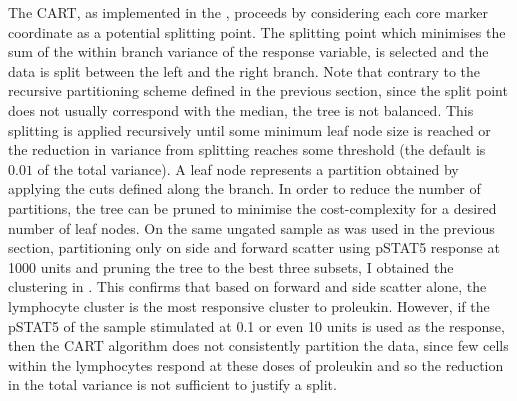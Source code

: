 The \gls{CART}, as implemented in the , proceeds by considering each core marker coordinate as a potential splitting point.
The splitting point which minimises the sum of the within branch variance of the response variable,
is selected and the data is split between the left and the right branch.
Note that contrary to the recursive partitioning scheme defined in the previous section, since the split point does not usually correspond with the median, the tree is not balanced.
This splitting is applied recursively until some minimum leaf node size is reached
or the reduction in variance from splitting reaches some threshold (the default is $0.01$ of the total variance).
A leaf node represents a partition obtained by applying the cuts defined along the branch.
In order to reduce the number of partitions, the tree can be pruned to minimise the cost-complexity
for a desired number of leaf nodes.
On the same ungated sample as was used in the previous section, partitioning only on side and forward scatter using pSTAT5 response
at 1000 units and pruning the tree to the best three subsets,
I obtained the clustering in .
This confirms that based on forward and side scatter alone, the lymphocyte cluster is the most responsive cluster to proleukin.
However, if the pSTAT5 of the sample stimulated at 0.1 or even 10 units is used as the response, then the \gls{CART} algorithm
does not consistently partition the data, since few cells within the lymphocytes respond at these doses
of proleukin and so the reduction in the total variance is not sufficient to justify a split.

